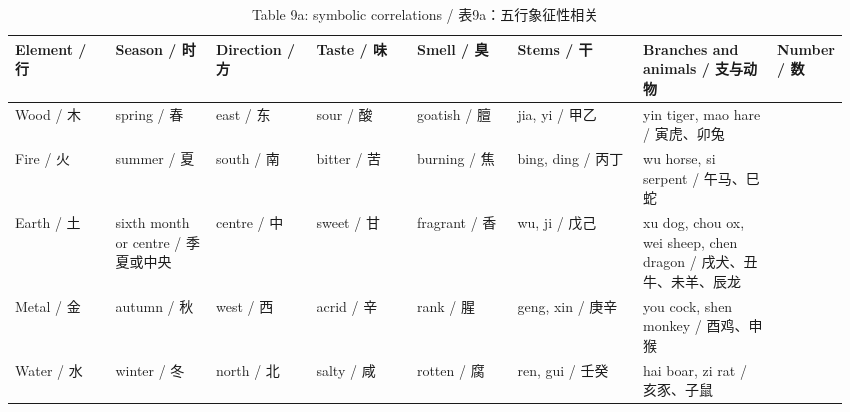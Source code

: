 \documentclass[UTF8,zihao=-4]{ctexart}
\begin{document}
\begin{longtable}{>{\raggedright\arraybackslash}p{0.12\linewidth}
                  >{\raggedright\arraybackslash}p{0.12\linewidth}
                  >{\raggedright\arraybackslash}p{0.12\linewidth}
                  >{\raggedright\arraybackslash}p{0.12\linewidth}
                  >{\raggedright\arraybackslash}p{0.12\linewidth}
                  >{\raggedright\arraybackslash}p{0.15\linewidth}
                  >{\raggedright\arraybackslash}p{0.16\linewidth}
                  >{\raggedright\arraybackslash}p{0.06\linewidth}}
\caption{Table 9a: symbolic correlations / 表9a：五行象征性相关}\\
\toprule
Element / 行 & Season / 时 & Direction / 方 & Taste / 味 & Smell / 臭 & Stems / 干 & Branches and animals / 支与动物 & Number / 数\\
\midrule
Wood / 木 & spring / 春 & east / 东 & sour / 酸 & goatish / 膻 & jia, yi / 甲乙 & yin tiger, mao hare / 寅虎、卯兔 & 8\\
Fire / 火 & summer / 夏 & south / 南 & bitter / 苦 & burning / 焦 & bing, ding / 丙丁 & wu horse, si serpent / 午马、巳蛇 & 7\\
Earth / 土 & sixth month or centre / 季夏或中央 & centre / 中 & sweet / 甘 & fragrant / 香 & wu, ji / 戊己 & xu dog, chou ox, wei sheep, chen dragon / 戌犬、丑牛、未羊、辰龙 & 5\\
Metal / 金 & autumn / 秋 & west / 西 & acrid / 辛 & rank / 腥 & geng, xin / 庚辛 & you cock, shen monkey / 酉鸡、申猴 & 9\\
Water / 水 & winter / 冬 & north / 北 & salty / 咸 & rotten / 腐 & ren, gui / 壬癸 & hai boar, zi rat / 亥豕、子鼠 & 6\\
\bottomrule
\end{longtable}
\end{document}
